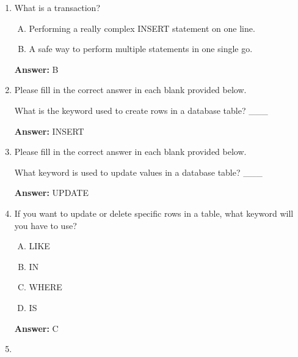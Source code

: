 \documentclass[12pt]{article}
\begin{document}
\begin{enumerate}[1.]
    \item

    What is a transaction?

    \bigskip

    \begin{enumerate}[A.]
        \item Performing a really complex INSERT statement on one line.
        \item A safe way to perform multiple statements in one single go.
    \end{enumerate}

    \bigskip

    \textbf{Answer:} B

    \item

    Please fill in the correct answer in each blank provided below.

    \bigskip

    What is the keyword used to create rows in a database table?  \_\_\_

    \bigskip

    \textbf{Answer:} INSERT

    \item

    Please fill in the correct answer in each blank provided below.

    \bigskip

    What keyword is used to update values in a database table?  \_\_\_

    \bigskip

    \textbf{Answer:} UPDATE

    \item

    If you want to update or delete specific rows in a table, what keyword will
    you have to use?

    \bigskip

    \begin{enumerate}[A.]
        \item LIKE
        \item IN
        \item WHERE
        \item IS
    \end{enumerate}

    \bigskip

    \textbf{Answer:} C

    \item


\end{enumerate}
\end{document}
